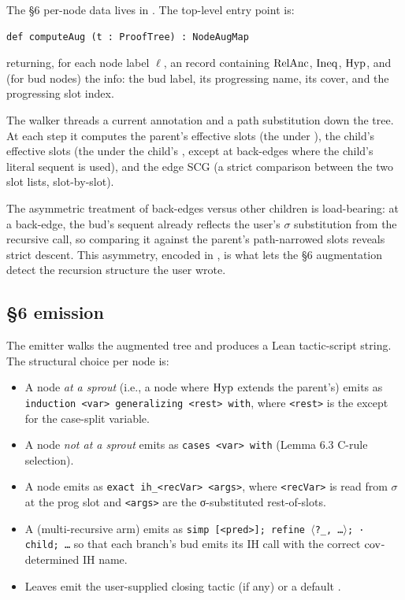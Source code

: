 The §6 per-node data lives in . The
top-level entry point is:

\begin{lstlisting}
def computeAug (t : ProofTree) : NodeAugMap
\end{lstlisting}

returning, for each node label \(\ell\), an  record
containing \(\mathrm{RelAnc}\), \(\mathrm{Ineq}\), \(\mathrm{Hyp}\), and (for bud nodes) the
 info: the bud label, its progressing name, its cover, and the
progressing slot index.

The walker  threads a current annotation
 and a path substitution  down the
tree. At each step it computes the parent's effective slots (the
 under ), the child's effective slots (the
 under the child's , except at back-edges where the
child's literal sequent is used), and the edge SCG (a strict comparison
between the two slot lists, slot-by-slot).

The asymmetric treatment of back-edges versus other children is
load-bearing: at a back-edge, the bud's sequent already reflects the
user's \(\sigma\) substitution from the recursive call, so comparing it
against the parent's path-narrowed slots reveals strict descent. This
asymmetry, encoded in , is what lets the §6 augmentation
detect the recursion structure the user wrote.

\subsection{§6 emission}
\label{sec:impl-emission}

The emitter  walks the augmented tree and
produces a Lean tactic-script string. The structural choice per node is:

\begin{itemize}
  \item A  node \emph{at a sprout} (i.e., a node where
    \(\mathrm{Hyp}\) extends the parent's) emits as \texttt{induction <var>
    generalizing <rest> with}, where \texttt{<rest>} is the
     except for the case-split variable.
  \item A  node \emph{not at a sprout} emits as
    \texttt{cases <var> with} (Lemma 6.3 C-rule selection).
  \item A  node emits as \texttt{exact ih\_<recVar> <args>},
    where \texttt{<recVar>} is read from \(\sigma\) at the prog slot and
    \texttt{<args>} are the σ-substituted rest-of-slots.
  \item A  (multi-recursive arm) emits as
    \texttt{simp [<pred>]; refine \(\langle\)?\_, \dots\(\rangle\); ·
    child; \dots} so that each branch's bud emits its IH call with the
    correct \(\mathrm{cov}\)-determined IH name.
  \item Leaves emit the user-supplied closing tactic (if any) or a default
    .
\end{itemize}

